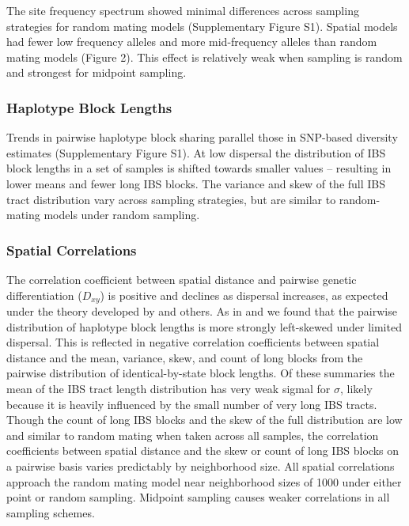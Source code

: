 \documentclass[9pt,twocolumn,twoside,lineno]{gsajnl}
\begin{document}
The site frequency spectrum showed minimal differences across sampling strategies for random mating models (Supplementary Figure S1). Spatial models had fewer low frequency alleles and more mid-frequency alleles than random mating models (Figure 2). This effect is relatively weak when sampling is random and strongest for midpoint sampling. 

\subsubsection{Haplotype Block Lengths}
Trends in pairwise haplotype block sharing parallel those in SNP-based diversity estimates (Supplementary Figure S1). At low dispersal the distribution of IBS block lengths in a set of samples is shifted towards smaller values -- resulting in lower means and fewer long IBS blocks. The variance and skew of the full IBS tract distribution vary across sampling strategies, but are similar to random-mating models under random sampling. 

\subsubsection{Spatial Correlations}
The correlation coefficient between spatial distance and pairwise genetic differentiation ($D_{xy}$) is positive and declines as dispersal increases, as expected under the theory developed by \citep{Rousset1997} and others. As in \citep{Ringbauer2017} and \citep{Baharian2016} we found that the pairwise distribution of haplotype block lengths is more strongly left-skewed under limited dispersal. This is reflected in negative correlation coefficients between spatial distance and the mean, variance, skew, and count of long blocks from the pairwise distribution of identical-by-state block lengths. Of these summaries the mean of the IBS tract length distribution has very weak sigmal for $\sigma$, likely because it is heavily influenced by the small number of very long IBS tracts. Though the count of long IBS blocks and the skew of the full distribution are low and similar to random mating when taken across all samples, the correlation coefficients between spatial distance and the skew or count of long IBS blocks on a pairwise basis varies predictably by neighborhood size. All spatial correlations approach the random mating model near neighborhood sizes of 1000 under either point or random sampling. Midpoint sampling causes weaker correlations in all sampling schemes. 
\end{document}

